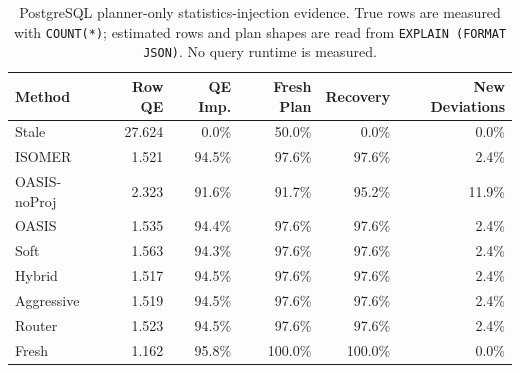 \begin{table}[t]
  \centering
  \small
  \caption{PostgreSQL planner-only statistics-injection evidence. True rows are measured with \texttt{COUNT(*)}; estimated rows and plan shapes are read from \texttt{EXPLAIN (FORMAT JSON)}. No query runtime is measured.}
  \label{tab:postgres_planner_stats_injection}
  \setlength{\tabcolsep}{4pt}
  \begin{tabular}{lrrrrr}
    \toprule
    Method & Row QE & QE Imp. & Fresh Plan & Recovery & New Deviations \\
    \midrule
    Stale & 27.624 & 0.0\% & 50.0\% & 0.0\% & 0.0\% \\
    ISOMER & 1.521 & 94.5\% & 97.6\% & 97.6\% & 2.4\% \\
    OASIS-noProj & 2.323 & 91.6\% & 91.7\% & 95.2\% & 11.9\% \\
    OASIS & 1.535 & 94.4\% & 97.6\% & 97.6\% & 2.4\% \\
    Soft & 1.563 & 94.3\% & 97.6\% & 97.6\% & 2.4\% \\
    Hybrid & 1.517 & 94.5\% & 97.6\% & 97.6\% & 2.4\% \\
    Aggressive & 1.519 & 94.5\% & 97.6\% & 97.6\% & 2.4\% \\
    Router & 1.523 & 94.5\% & 97.6\% & 97.6\% & 2.4\% \\
    Fresh & 1.162 & 95.8\% & 100.0\% & 100.0\% & 0.0\% \\
    \bottomrule
  \end{tabular}
\end{table}
